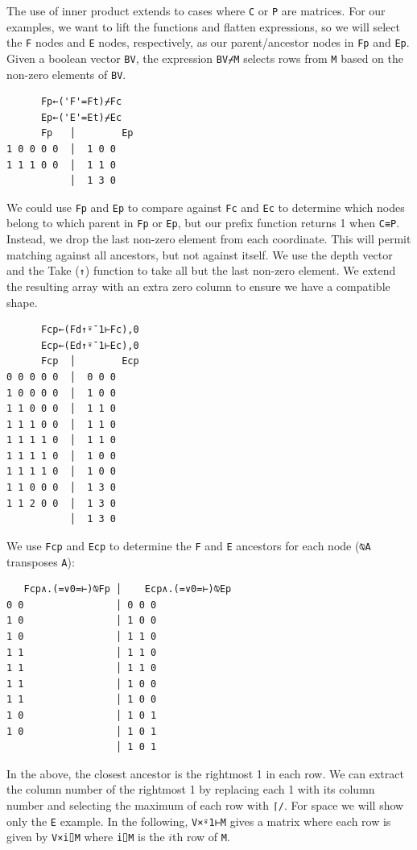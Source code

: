 ﻿\documentclass[numbers,10pt,preprint]{sigplanconf}
\begin{document}
The use of inner product extends to cases where \verb;C; or \verb;P; are matrices. For our examples, we want to lift the functions and flatten expressions, so we will select the \verb;F; nodes and \verb;E; nodes, respectively, as our parent/ancestor nodes in \verb;Fp; and \verb;Ep;. Given a boolean vector \verb;BV;, the expression \verb;BV⌿M; selects rows from \verb;M; based on the non-zero elements of \verb;BV;.

\begin{verbatim}
      Fp←('F'=Ft)⌿Fc
      Ep←('E'=Et)⌿Ec
      Fp   │        Ep
1 0 0 0 0  │  1 0 0
1 1 1 0 0  │  1 1 0
           │  1 3 0
\end{verbatim}

\noindent We could use \verb;Fp; and \verb;Ep; to compare against \verb;Fc; and \verb;Ec; to determine which nodes belong to which parent in \verb;Fp; or \verb;Ep;, but our prefix function returns 1 when \verb;C≡P;. Instead, we drop the last non-zero element from each coordinate. This will permit matching against all ancestors, but not against itself. We use the depth vector and the Take (\verb;↑;) function to take all but the last non-zero element. We extend the resulting array with an extra zero column to ensure we have a compatible shape.

\begin{verbatim}
      Fcp←(Fd↑⍤¯1⊢Fc),0
      Ecp←(Ed↑⍤¯1⊢Ec),0
      Fcp  │        Ecp
0 0 0 0 0  │  0 0 0
1 0 0 0 0  │  1 0 0
1 1 0 0 0  │  1 1 0
1 1 1 0 0  │  1 1 0
1 1 1 1 0  │  1 1 0
1 1 1 1 0  │  1 0 0
1 1 1 1 0  │  1 0 0
1 1 0 0 0  │  1 3 0
1 1 2 0 0  │  1 3 0
           │  1 3 0
\end{verbatim}

\noindent We use \verb;Fcp; and \verb;Ecp; to determine the \verb;F; and \verb;E; ancestors for each node (\verb;⍉A; transposes \verb;A;):

\begin{verbatim}
   Fcp∧.(=∨0=⊢)⍉Fp │    Ecp∧.(=∨0=⊢)⍉Ep
0 0                │ 0 0 0
1 0                │ 1 0 0
1 0                │ 1 1 0
1 1                │ 1 1 0
1 1                │ 1 1 0
1 1                │ 1 0 0
1 1                │ 1 0 0
1 0                │ 1 0 1
1 0                │ 1 0 1
                   │ 1 0 1
\end{verbatim}

\noindent In the above, the closest ancestor is the rightmost 1 in each row. We can extract the column number of the rightmost 1 by replacing each 1 with its column number and selecting the maximum of each row with \verb;⌈/;. For space we will show only the \verb;E; example. In the following, \verb;V×⍤1⊢M; gives a matrix where each row is given by \verb;V×i⌷M; where \verb;i⌷M; is the $i$th row of \verb;M;.
\end{document}

